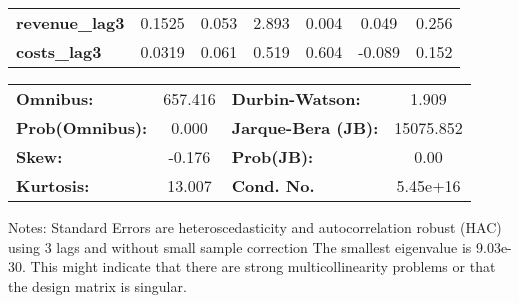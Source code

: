 \begin{center}
\begin{tabular}{lcccccc}
\textbf{revenue\_lag3}                   &       0.1525  &        0.053     &     2.893  &         0.004        &        0.049    &        0.256     \\
\textbf{costs\_lag3}                     &       0.0319  &        0.061     &     0.519  &         0.604        &       -0.089    &        0.152     \\
\bottomrule
\end{tabular}
\begin{tabular}{lclc}
\textbf{Omnibus:}       & 657.416 & \textbf{  Durbin-Watson:     } &     1.909  \\
\textbf{Prob(Omnibus):} &   0.000 & \textbf{  Jarque-Bera (JB):  } & 15075.852  \\
\textbf{Skew:}          &  -0.176 & \textbf{  Prob(JB):          } &      0.00  \\
\textbf{Kurtosis:}      &  13.007 & \textbf{  Cond. No.          } &  5.45e+16  \\
\bottomrule
\end{tabular}
\end{center}

Notes: \newline
 [1] Standard Errors are heteroscedasticity and autocorrelation robust (HAC) using 3 lags and without small sample correction \newline
 [2] The smallest eigenvalue is 9.03e-30. This might indicate that there are \newline
 strong multicollinearity problems or that the design matrix is singular.